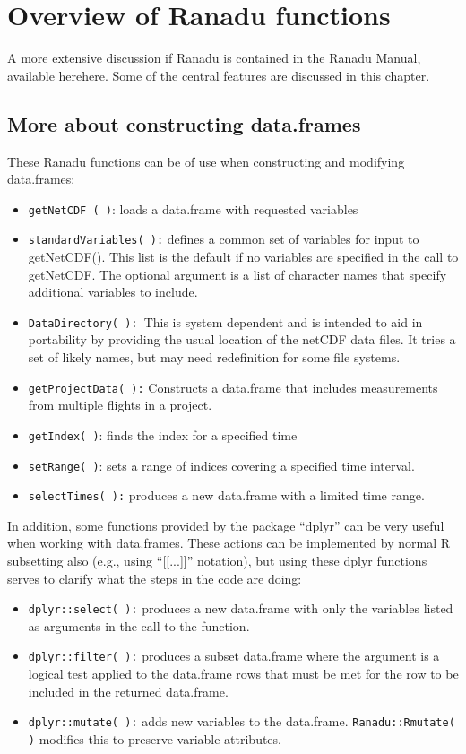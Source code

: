\documentclass[12pt,english]{report}\usepackage[]{graphicx}\usepackage[]{color}
\begin{document}
\chapter{Overview of Ranadu functions}

A more extensive discussion if Ranadu is contained in the Ranadu Manual,
available here\href{https://github.com/NCAR/Ranadu/blob/WAC/inst/RanaduManual.pdf}{here}.
Some of the central features are discussed in this chapter.

\section{More about constructing data.frames}

These Ranadu functions can be of use when constructing and modifying
data.frames:
\begin{itemize}
\item \texttt{getNetCDF ( )}: loads a data.frame with requested variables
\item \texttt{standardVariables( ):} defines a common set of variables for
input to getNetCDF(). This list is the default if no variables are
specified in the call to getNetCDF. The optional argument is a list
of character names that specify additional variables to include.
\item \texttt{DataDirectory( ): }This is system dependent and is intended
to aid in portability by providing the usual location of the netCDF
data files. It tries a set of likely names, but may need redefinition
for some file systems.
\item \texttt{getProjectData( ):} Constructs a data.frame that includes
measurements from multiple flights in a project.
\item \texttt{getIndex( )}: finds the index for a specified time
\item \texttt{setRange( )}: sets a range of indices covering a specified
time interval.
\item \texttt{selectTimes( ):} produces a new data.frame with a limited
time range.
\end{itemize}
In addition, some functions provided by the package ``dplyr'' can
be very useful when working with data.frames. These actions can be
implemented by normal R subsetting also (e.g., using ``{[}{[}...{]}{]}''
notation), but using these dplyr functions serves to clarify what
the steps in the code are doing:
\begin{itemize}
\item \texttt{dplyr::select( ):} produces a new data.frame with only the
variables listed as arguments in the call to the function.
\item \texttt{dplyr::filter( ):} produces a subset data.frame where the
argument is a logical test applied to the data.frame rows that must
be met for the row to be included in the returned data.frame.
\item \texttt{dplyr::mutate( ):} adds new variables to the data.frame. \texttt{Ranadu::Rmutate(
)} modifies this to preserve variable attributes.
\end{itemize}
\end{document}

